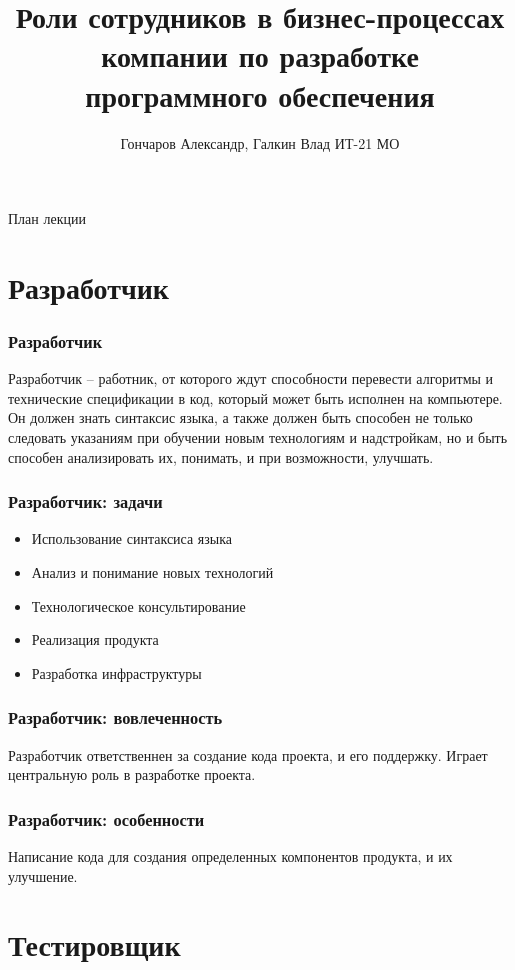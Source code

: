 \documentclass{../industrial-development}
\title{Роли сотрудников в бизнес-процессах компании по разработке программного обеспечения}
\author{Гончаров Александр, Галкин Влад ИТ-21 МО}
\date{}
\begin{document}
	
	\begin{frame}
		\titlepage
	\end{frame}
	
	\begin{frame}{План лекции}
		\tableofcontents
	\end{frame}
	
	
	\section{Разработчик }
	
	\begin{frame} \frametitle{Разработчик}
		\begin{block}{}
			\alert {}Разработчик – работник, от которого ждут способности перевести алгоритмы и технические спецификации в код, который может быть исполнен на компьютере. Он должен знать синтаксис языка, а также должен быть способен не только следовать указаниям при обучении новым технологиям и надстройкам, но и быть способен анализировать их, понимать, и при возможности, улучшать.
			
		\end{block}
		
	\end{frame}
	
	\begin{frame} \frametitle{Разработчик: задачи}
		\begin{itemize}
			\item Использование синтаксиса языка
			\item Анализ и понимание новых технологий
			\item Технологическое консультирование
			\item Реализация продукта
			\item Разработка инфраструктуры
		\end{itemize}
	\end{frame}
	
	\begin{frame} \frametitle{Разработчик: вовлеченность}
		Разработчик ответственнен за создание кода проекта, и его поддержку. Играет центральную роль в разработке проекта.
	\end{frame}
	
	\begin{frame} \frametitle{Разработчик: особенности}
		Написание кода для создания определенных компонентов продукта, и их улучшение. 	
	\end{frame}
	
	\section{Тестировщик }
	
\end{document}
